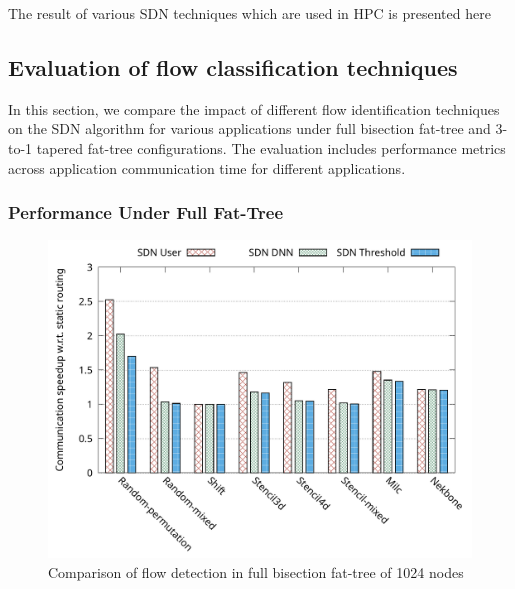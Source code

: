 The result of various SDN techniques which are used in HPC is presented here

\subsection{Evaluation of flow classification techniques}

In this section, we compare the impact of different flow identification techniques on the SDN algorithm for various applications under full bisection fat-tree and 3-to-1 tapered fat-tree configurations. The evaluation includes performance metrics across application communication time for different applications.

\subsubsection{Performance Under Full Fat-Tree}
\begin{figure}[h]
  \centering
  \includegraphics[width=\columnwidth]{./figs_4/full_fat_flow_detection.pdf}
  \caption{Comparison of flow detection in full bisection fat-tree of 1024 nodes}
  \label{fig:fld_full}
\end{figure}

